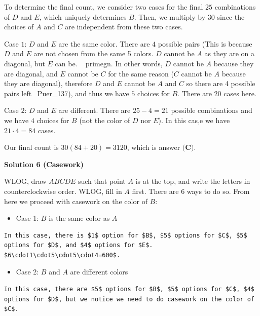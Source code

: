 \begin{enumerate}
 To determine the final count, we consider two cases for the final $25$ combinations of $D$ and $E$, which uniquely determines $B$. Then, we multiply by $30$ since the choices of $A$ and $C$ are independent from these two cases.

 Case $1$: $D$ and $E$ are the same color. There are $4$ possible pairs (This is because $D$ and $E$ are not chosen from the same 5 colors. $D$ cannot be $A$ as they are on a diagonal, but $E$ can be. ~ primegn. In other words, $D$ cannot be $A$ because they are diagonal, and $E$ cannot be $C$ for the same reason ($C$ cannot be $A$ because they are diagonal), therefore $D$ and $E$ cannot be $A$ and $C$ so there are 4 possible pairs left ~Puer\_137), and thus we have $5$ choices for $B$. There are $20$ cases here.

 Case $2$: $D$ and $E$ are different. There are $25-4 = 21$ possible combinations and we have $4$ choices for $B$ (not the color of $D$ nor $E$). In this cas,e we have $21 \cdot 4 = 84$ cases.

 Our final count is $30(84+20) = \boxed{3120}$, which is answer $\boxed{\textbf{(C)}}$.

 



\textbf{Solution 6 (Casework)}

WLOG, draw $ABCDE$ such that point $A$ is at the top, and write the letters in counterclockwise order. WLOG, fill in $A$ first. There are $6$ ways to do so. From here we proceed with casework on the color of $B$:

 
            \begin{itemize}
        \item Case 1: $B$ is the same color as $A$
            \end{itemize}
            \begin{verbatim}
In this case, there is $1$ option for $B$, $5$ options for $C$, $5$ options for $D$, and $4$ options for $E$. $6\cdot1\cdot5\cdot5\cdot4=600$.
\end{verbatim}


            \begin{itemize}
        \item Case 2: $B$ and $A$ are different colors
            \end{itemize}
            \begin{verbatim}
In this case, there are $5$ options for $B$, $5$ options for $C$, $4$ options for $D$, but we notice we need to do casework on the color of $C$.
\end{verbatim}



\end{enumerate}
